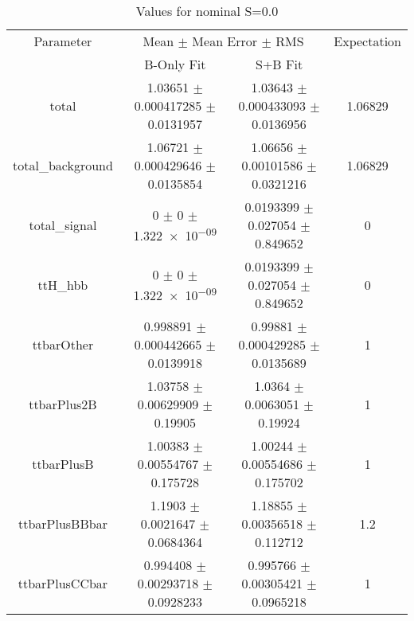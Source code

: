 \begin{table}
\centering
\caption{Values for nominal S=0.0}
\begin{tabular}{cccc}
\toprule
Parameter & \multicolumn{2}{c}{Mean $\pm$ Mean Error $\pm$ RMS} & Expectation\\
 & B-Only Fit & S+B Fit & \\
\midrule
total & \num{1.03651} $\pm$ \num{0.000417285} $\pm$ \num{0.0131957} & \num{1.03643} $\pm$ \num{0.000433093} $\pm$ \num{0.0136956} & \num{1.06829}\\
total\_background & \num{1.06721} $\pm$ \num{0.000429646} $\pm$ \num{0.0135854} & \num{1.06656} $\pm$ \num{0.00101586} $\pm$ \num{0.0321216} & \num{1.06829}\\
total\_signal & \num{0} $\pm$ \num{0} $\pm$ \num{1.322e-09} & \num{0.0193399} $\pm$ \num{0.027054} $\pm$ \num{0.849652} & \num{0}\\
ttH\_hbb & \num{0} $\pm$ \num{0} $\pm$ \num{1.322e-09} & \num{0.0193399} $\pm$ \num{0.027054} $\pm$ \num{0.849652} & \num{0}\\
ttbarOther & \num{0.998891} $\pm$ \num{0.000442665} $\pm$ \num{0.0139918} & \num{0.99881} $\pm$ \num{0.000429285} $\pm$ \num{0.0135689} & \num{1}\\
ttbarPlus2B & \num{1.03758} $\pm$ \num{0.00629909} $\pm$ \num{0.19905} & \num{1.0364} $\pm$ \num{0.0063051} $\pm$ \num{0.19924} & \num{1}\\
ttbarPlusB & \num{1.00383} $\pm$ \num{0.00554767} $\pm$ \num{0.175728} & \num{1.00244} $\pm$ \num{0.00554686} $\pm$ \num{0.175702} & \num{1}\\
ttbarPlusBBbar & \num{1.1903} $\pm$ \num{0.0021647} $\pm$ \num{0.0684364} & \num{1.18855} $\pm$ \num{0.00356518} $\pm$ \num{0.112712} & \num{1.2}\\
ttbarPlusCCbar & \num{0.994408} $\pm$ \num{0.00293718} $\pm$ \num{0.0928233} & \num{0.995766} $\pm$ \num{0.00305421} $\pm$ \num{0.0965218} & \num{1}\\
\bottomrule
\end{tabular}
\end{table}
